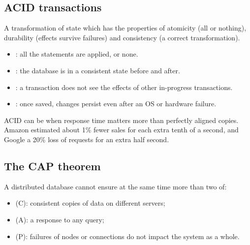 \subsection{ACID transactions}
\begin{definition}
A transformation of state which has the properties of atomicity (all or nothing), durability (effects survive failures) and consistency (a correct transformation).
\end{definition}
\begin{itemize}
  \item {}: all the statements are applied, or none.
  \item {}: the database is in a consistent state before and after.
  \item {}: a transaction does not see the effects of other in-progress transactions.
  \item {}: once saved, changes persist even after an OS or hardware failure.
\end{itemize}

ACID can be  when response time matters more than perfectly aligned copies. Amazon estimated about 1\% fewer sales for each extra tenth of a second, and Google a 20\% loss of requests for an extra half second.

\subsection{The CAP theorem}
\begin{theorem}
A distributed database cannot ensure at the same time more than two of:
\begin{itemize}
  \item {} (C): consistent copies of data on different servers;
  \item {} (A): a response to any query;
  \item {} (P): failures of nodes or connections do not impact the system as a whole.
\end{itemize}
\end{theorem}

\begin{center}
\end{center}

